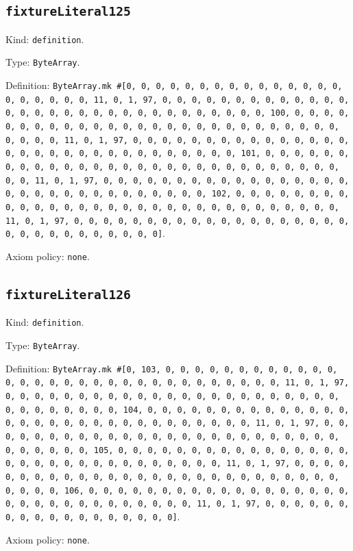 \documentclass[11pt]{article}
\begin{document}
\subsection*{\texttt{fixtureLiteral125}}
\noindent Kind: \texttt{definition}.\par
\noindent Type: \texttt{ByteArray}.\par
\noindent Definition: \texttt{ByteArray.mk \#[0, 0, 0, 0, 0, 0, 0, 0, 0, 0, 0, 0, 0, 0, 0, 0, 0, 0, 0, 0, 0, 11, 0, 1, 97, 0, 0, 0, 0, 0, 0, 0, 0, 0, 0, 0, 0, 0, 0, 0, 0, 0, 0, 0, 0, 0, 0, 0, 0, 0, 0, 0, 0, 0, 0, 0, 100, 0, 0, 0, 0, 0, 0, 0, 0, 0, 0, 0, 0, 0, 0, 0, 0, 0, 0, 0, 0, 0, 0, 0, 0, 0, 0, 0, 0, 0, 0, 0, 11, 0, 1, 97, 0, 0, 0, 0, 0, 0, 0, 0, 0, 0, 0, 0, 0, 0, 0, 0, 0, 0, 0, 0, 0, 0, 0, 0, 0, 0, 0, 0, 0, 0, 0, 101, 0, 0, 0, 0, 0, 0, 0, 0, 0, 0, 0, 0, 0, 0, 0, 0, 0, 0, 0, 0, 0, 0, 0, 0, 0, 0, 0, 0, 0, 0, 0, 11, 0, 1, 97, 0, 0, 0, 0, 0, 0, 0, 0, 0, 0, 0, 0, 0, 0, 0, 0, 0, 0, 0, 0, 0, 0, 0, 0, 0, 0, 0, 0, 0, 0, 0, 102, 0, 0, 0, 0, 0, 0, 0, 0, 0, 0, 0, 0, 0, 0, 0, 0, 0, 0, 0, 0, 0, 0, 0, 0, 0, 0, 0, 0, 0, 0, 0, 11, 0, 1, 97, 0, 0, 0, 0, 0, 0, 0, 0, 0, 0, 0, 0, 0, 0, 0, 0, 0, 0, 0, 0, 0, 0, 0, 0, 0, 0, 0, 0, 0, 0]}.\par
\noindent Axiom policy: \texttt{none}.\par
\subsection*{\texttt{fixtureLiteral126}}
\noindent Kind: \texttt{definition}.\par
\noindent Type: \texttt{ByteArray}.\par
\noindent Definition: \texttt{ByteArray.mk \#[0, 103, 0, 0, 0, 0, 0, 0, 0, 0, 0, 0, 0, 0, 0, 0, 0, 0, 0, 0, 0, 0, 0, 0, 0, 0, 0, 0, 0, 0, 0, 0, 0, 11, 0, 1, 97, 0, 0, 0, 0, 0, 0, 0, 0, 0, 0, 0, 0, 0, 0, 0, 0, 0, 0, 0, 0, 0, 0, 0, 0, 0, 0, 0, 0, 0, 0, 0, 104, 0, 0, 0, 0, 0, 0, 0, 0, 0, 0, 0, 0, 0, 0, 0, 0, 0, 0, 0, 0, 0, 0, 0, 0, 0, 0, 0, 0, 0, 0, 0, 11, 0, 1, 97, 0, 0, 0, 0, 0, 0, 0, 0, 0, 0, 0, 0, 0, 0, 0, 0, 0, 0, 0, 0, 0, 0, 0, 0, 0, 0, 0, 0, 0, 0, 0, 105, 0, 0, 0, 0, 0, 0, 0, 0, 0, 0, 0, 0, 0, 0, 0, 0, 0, 0, 0, 0, 0, 0, 0, 0, 0, 0, 0, 0, 0, 0, 0, 11, 0, 1, 97, 0, 0, 0, 0, 0, 0, 0, 0, 0, 0, 0, 0, 0, 0, 0, 0, 0, 0, 0, 0, 0, 0, 0, 0, 0, 0, 0, 0, 0, 0, 0, 106, 0, 0, 0, 0, 0, 0, 0, 0, 0, 0, 0, 0, 0, 0, 0, 0, 0, 0, 0, 0, 0, 0, 0, 0, 0, 0, 0, 0, 0, 0, 0, 11, 0, 1, 97, 0, 0, 0, 0, 0, 0, 0, 0, 0, 0, 0, 0, 0, 0, 0, 0, 0, 0]}.\par
\noindent Axiom policy: \texttt{none}.\par
\end{document}
